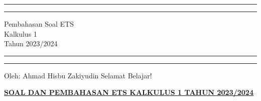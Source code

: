 \documentclass[10pt,openany,a4paper]{article}
\theoremstyle{definition}
\theoremstyle{definition}
\theoremstyle{plain}
\begin{document}
\begin{titlepage}
	\centering %
	\vspace*{1.5\baselineskip} %

	\rule{13cm}{1.6pt}\vspace*{-\baselineskip}\vspace*{2pt} %
	\rule{13cm}{0.4pt} %
	
		\vspace{0.75\baselineskip} %
	{	\Huge Pembahasan Soal ETS\\ 
			\vspace{4mm}
		Kalkulus 1 \\ \vspace{2mm} \huge{Tahun 2023/2024}\\	}
		\vspace{0.75\baselineskip} %
	\rule{13cm}{0.4pt}\vspace*{-\baselineskip}\vspace{3.2pt} %
	\rule{13cm}{1.6pt} %
	
		\vspace{1.75\baselineskip} %
{\large Oleh: Ahmad Hisbu Zakiyudin}
	\vfill
	\vspace{1mm}
\huge{Selamat Belajar!}
\end{titlepage}
\makeatletter
\setlength\fboxsep{3pt}
\setlength{\headheight}{24pt}
 \begin{center}
	{\underline{\textbf{\MakeUppercase{Soal dan Pembahasan ETS Kalkulus 1 Tahun 2023/2024}}}}
    \end{center}
\end{document}
